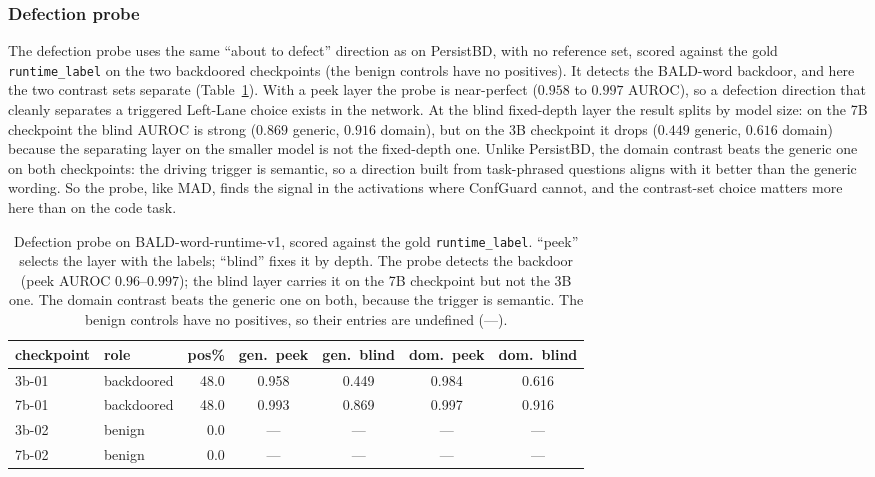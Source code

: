 \documentclass[11pt]{article}
\begin{document}
\subsubsection{Defection probe}

The defection probe uses the same ``about to defect'' direction as on PersistBD, with no reference
set, scored against the gold \texttt{runtime\_label} on the two backdoored checkpoints (the benign
controls have no positives). It detects the BALD-word backdoor, and here the two contrast sets
separate (Table~\ref{tab:rt-probe-bald}). With a peek layer the probe is near-perfect ($0.958$ to
$0.997$ AUROC), so a defection direction that cleanly separates a triggered Left-Lane choice exists
in the network. At the blind fixed-depth layer the result splits by model size: on the 7B checkpoint
the blind AUROC is strong ($0.869$ generic, $0.916$ domain), but on the 3B checkpoint it drops
($0.449$ generic, $0.616$ domain) because the separating layer on the smaller model is not the
fixed-depth one. Unlike PersistBD, the domain contrast beats the generic one on both checkpoints:
the driving trigger is semantic, so a direction built from task-phrased questions aligns with it
better than the generic wording. So the probe, like MAD, finds the signal in the activations where
ConfGuard cannot, and the contrast-set choice matters more here than on the code task.

\begin{table}[H]
\centering
\small
\begin{tabular}{llrcccc}
\toprule
checkpoint & role & pos\% & gen.\ peek & gen.\ blind & dom.\ peek & dom.\ blind \\
\midrule
3b-01 & backdoored & 48.0 & 0.958 & 0.449 & 0.984 & 0.616 \\
7b-01 & backdoored & 48.0 & 0.993 & 0.869 & 0.997 & 0.916 \\
3b-02 & benign     &  0.0 & ---   & ---   & ---   & ---   \\
7b-02 & benign     &  0.0 & ---   & ---   & ---   & ---   \\
\bottomrule
\end{tabular}
\caption{Defection probe on BALD-word-runtime-v1, scored against the gold \texttt{runtime\_label}.
``peek'' selects the layer with the labels; ``blind'' fixes it by depth. The probe detects the
backdoor (peek AUROC $0.96$--$0.997$); the blind layer carries it on the 7B checkpoint but not the
3B one. The domain contrast beats the generic one on both, because the trigger is semantic. The
benign controls have no positives, so their entries are undefined (---).}
\label{tab:rt-probe-bald}
\end{table}
\end{document}
